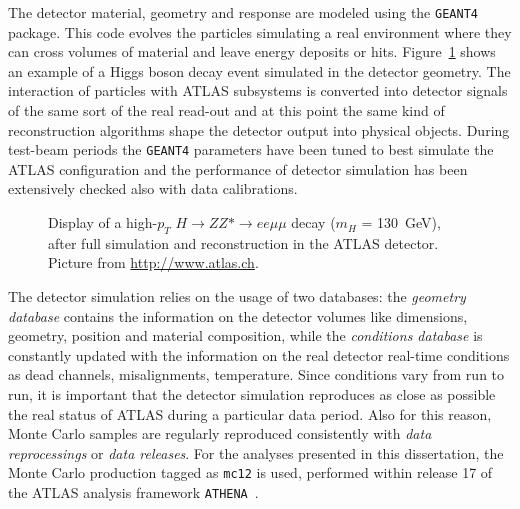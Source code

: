 The detector material, geometry and response %
are modeled using the {\tt GEANT4}~\cite{geant} package.
This code evolves the particles simulating a real environment
where they can cross volumes of material and leave energy
deposits or hits. Figure~\ref{fig:atlasdisplay} shows an
example of a Higgs boson decay event simulated in the detector
geometry.
The interaction of particles with ATLAS subsystems is converted
into detector signals of the same sort of the real read-out and
at this point the same kind of reconstruction algorithms shape
the detector output into physical objects. During test-beam periods
the \texttt{GEANT4} parameters have been tuned to best simulate
the ATLAS configuration and the performance of detector simulation
has been extensively checked also with data calibrations.

\begin{figure}[htb]\begin{center}
	\caption{Display of a high-$p_T$ $H \to ZZ*\to ee\mu\mu$ decay ($m_H$ = 130~GeV), 
        after full simulation and reconstruction in the ATLAS detector. Picture from \url{http://www.atlas.ch}. \label{fig:atlasdisplay}}
\end{center}\end{figure}


The detector simulation relies on the usage of two databases: the 
{\it geometry database} contains the information on the detector volumes
like dimensions, geometry, position and material composition, while
the {\it conditions database} is constantly updated with the information
on the real detector real-time conditions as dead channels, misalignments,
temperature. Since conditions vary from run to run, it is important that
the detector simulation reproduces as close as possible the real status
of ATLAS during a particular data period. Also for this reason, Monte
Carlo samples are regularly reproduced consistently with {\it data reprocessings}
or {\it data releases}.  For the analyses presented in this dissertation,
the Monte Carlo production tagged as \texttt{mc12} is used, performed
within release 17 of the ATLAS analysis framework \texttt{ATHENA}~\cite{Calafiura:2005zz}.



